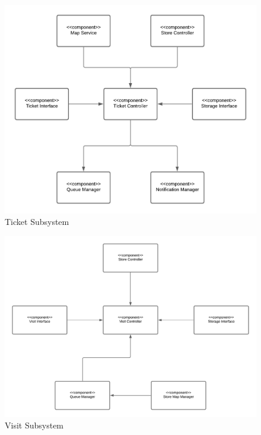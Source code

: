 \documentclass[a4paper, 12pt, oneside, table]{article}
\begin{document}
\begin{figure}[h!]
\centering
    \centering
    \includegraphics[height=0.3\textheight, width=0.8\linewidth, keepaspectratio]{img/ticket_subsys_integrationpng.png}
    \caption{Ticket Subsystem}
    \label{ticket_subsys_integration}
\end{figure}

\begin{figure}[h!]
\centering
    \centering
    \includegraphics[height=0.3\textheight, width=0.8\linewidth, keepaspectratio]{img/visit_subsystem.png}
    \caption{Visit Subsystem}
    \label{visit_subsystem}
\end{figure}
\end{document}

